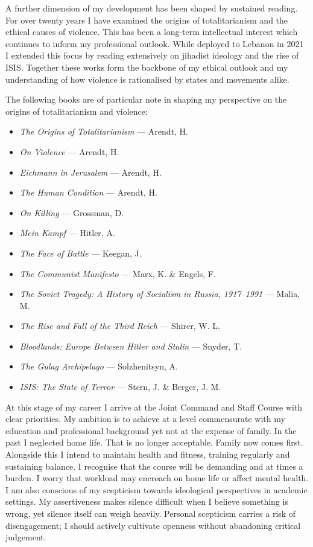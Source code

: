 A further dimension of my development has been shaped by sustained reading. For over twenty years I have examined the origins of totalitarianism and the ethical causes of violence. This has been a long-term intellectual interest which continues to inform my professional outlook. While deployed to Lebanon in 2021 I extended this focus by reading extensively on jihadist ideology and the rise of ISIS. Together these works form the backbone of my ethical outlook and my understanding of how violence is rationalised by states and movements alike.  

The following books are of particular note in shaping my perspective on the origins of totalitarianism and violence:  
\begin{itemize}
	\item \nocite{ARENDT_1966} \textit{The Origins of Totalitarianism} — Arendt, H.  
	\item \nocite{ARENDT_1970} \textit{On Violence} — Arendt, H.  
	\item \nocite{ARENDT_2006} \textit{Eichmann in Jerusalem} — Arendt, H.  
	\item \nocite{ARENDT_2018} \textit{The Human Condition} — Arendt, H.  
	\item \nocite{GROSSMAN_1996} \textit{On Killing} — Grossman, D.  
	\item \nocite{HITLER_1999} \textit{Mein Kampf} — Hitler, A.  
	\item \nocite{KEEGAN_1976} \textit{The Face of Battle} — Keegan, J.  
	\item \nocite{MARX_2015} \textit{The Communist Manifesto} — Marx, K. \& Engels, F.  
	\item \nocite{MALIA_1994} \textit{The Soviet Tragedy: A History of Socialism in Russia, 1917--1991} — Malia, M.
		\item \nocite{SHIRER_1991} \textit{The Rise and Fall of the Third Reich} — Shirer, W. L.
	\item \nocite{SNYDER_2010} \textit{Bloodlands: Europe Between Hitler and Stalin} — Snyder, T.
	\item \nocite{SOLZHENITSYN_2018} \textit{The Gulag Archipelago} — Solzhenitsyn, A.  
	\item \nocite{STERN_2016} \textit{ISIS: The State of Terror} — Stern, J. \& Berger, J. M.  
\end{itemize}  

At this stage of my career I arrive at the Joint Command and Staff Course with clear priorities. My ambition is to achieve at a level commensurate with my education and professional background yet not at the expense of family. In the past I neglected home life. That is no longer acceptable. Family now comes first. Alongside this I intend to maintain health and fitness, training regularly and sustaining balance. I recognise that the course will be demanding and at times a burden. I worry that workload may encroach on home life or affect mental health. I am also conscious of my scepticism towards ideological perspectives in academic settings. My assertiveness makes silence difficult when I believe something is wrong, yet silence itself can weigh heavily. Personal scepticism carries a risk of disengagement; I should actively cultivate openness without abandoning critical judgement.  

